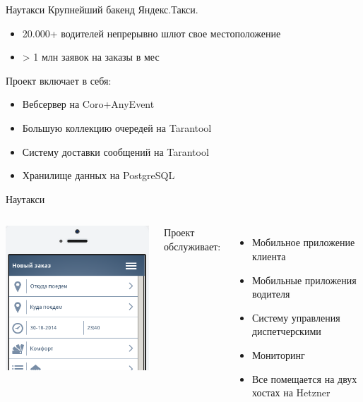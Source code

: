 \documentclass[aspectratio=169]{beamer}
\begin{document}
\begin{frame}{Наутакси}
    Крупнейший бакенд Яндекс.Такси.
    \begin{itemize}
        \item 20.000+ водителей непрерывно шлют свое местоположение
        \item > 1 млн заявок на заказы в мес
        \par\pause
    \end{itemize}

    Проект включает в себя:
    \begin{itemize}
        \item Вебсервер на Coro+AnyEvent
        \item Большую коллекцию очередей на Tarantool
        \item Систему доставки сообщений на Tarantool
        \item Хранилище данных на PostgreSQL
    \end{itemize}
\end{frame}

\begin{frame}{Наутакси}
    \begin{columns}
            \includegraphics[scale=0.8]{img/nowtaxi.png}
        
        Проект обслуживает:
        \begin{itemize}
            \item Мобильное приложение клиента
            \item Мобильные приложения водителя
            \item Систему управления диспетчерскими
            \item Мониторинг
            \par
            \item Все помещается на двух хостах на Hetzner
        \end{itemize}
    \end{columns}
\end{frame}
\end{document}
